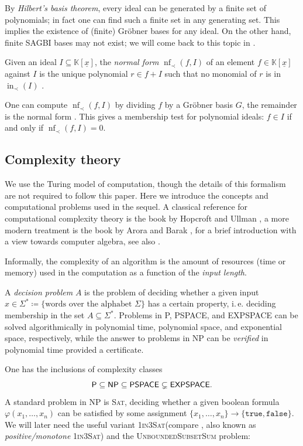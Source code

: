 \documentclass[12pt]{article}
\makeatletter
\newcommand{\KK}{\mathbb{K}}
\newcommand{\x}{{\underline x}}
\DeclareMathOperator{\ini}{in}
\DeclareMathOperator{\NF}{nf}
\newcommand{\problemText}[1]{\textsc{#1}\xspace}
\newcommand{\OneInThreeSAT}{\problemText{1in3Sat}}
\newcommand{\SubsetSum}{\problemText{UnboundedSubsetSum}}
\newcommand{\cclass}[1]{\textsf{\textup{#1}}\xspace}
\newcommand{\DP}{\cclass{P}}
\newcommand{\NP}{\cclass{NP}}
\newcommand{\PSPACE}{\cclass{PSPACE}}
\newcommand{\EXPSPACE}{\cclass{EXPSPACE}}
\newcommand{\ie}{i.\,e.\@\xspace}
\makeatother
\begin{document}
By \emph{Hilbert's basis theorem}, every ideal can be generated by a finite set of polynomials; in fact one can find such a finite set in any generating set. This implies the existence of (finite) Gröbner bases for any ideal. On the other hand, finite SAGBI bases may not exist; we will come back to this topic in .

\begin{definition}
Given an ideal $I \subseteq \KK[\x]$, the \emph{normal form} $\NF_\prec(f,I)$ of an element $f \in \KK[\x]$ against $I$ is the unique polynomial $r \in f+I$ such that no monomial of $r$ is in $\ini_\prec(I)$ \cite[Definition 2.4.8]{Kreuzer2000}.
\end{definition}

One can compute $\NF_\prec(f,I)$ by dividing $f$ by a Gröbner basis $G$, the remainder is the normal form \cite[Proposition 2.6.1]{Cox2016}. This gives a membership test for polynomial ideals: $f \in I$ if and only if $\NF_\prec(f,I) = 0$. 

\subsection{Complexity theory}\label{sec:complexity}

We use the Turing model of computation, though the details of this formalism are not required to follow this paper. Here we introduce the concepts and computational problems used in the sequel.
A classical reference for computational complexity theory is the book by Hopcroft and Ullman \cite{Hopcroft1979}, a more modern treatment is the book by Arora and Barak \cite{Arora2009}, for a brief introduction with a view towards computer algebra, see also \cite[Section 25.8]{Gathen2017}.

Informally, the complexity of an algorithm is the amount of resources (time or memory) used in the computation as a function of the \emph{input length}. 

\begin{definition}
A \emph{decision problem} $A$ is the problem of deciding whether a given input $x \in \Sigma^* \coloneqq \{\text{words over the alphabet }\Sigma\}$ has a certain property, \ie deciding membership in the set $A \subseteq \Sigma^*$.
Problems in \DP, \PSPACE, and \EXPSPACE can be solved algorithmically in polynomial time, polynomial space, and exponential space, respectively, while the answer to problems in \NP can be \emph{verified} in polynomial time provided a certificate.
\end{definition}
One has the inclusions of complexity classes
\[
\DP \subseteq \NP \subseteq \PSPACE \subsetneq \EXPSPACE.
\]
A standard problem in \NP is \problemText{Sat}, deciding whether a given boolean formula $\varphi(x_1,\dots,x_n)$ can be satisfied by some assignment $\{x_1,\dots,x_n\} \to \{\texttt{true},\texttt{false}\}$. We will later need the useful variant \OneInThreeSAT (compare \cite{Schaefer78}, also known as \emph{positive/monotone} \OneInThreeSAT) and the \SubsetSum problem:
\end{document}

